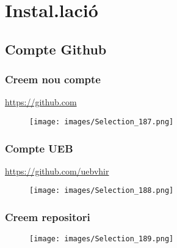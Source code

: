 \documentclass{beamer}
\begin{document}
\section{Instal.laci\'o}
\subsection{Compte Github} 
\begin{frame}
\frametitle{Creem nou compte}
\url{https://github.com} \hspace{1cm} 
	\begin{figure}
		\texttt{[image: images/Selection\_187.png]}
	\end{figure}
\end{frame}


\begin{frame}
	\frametitle{Compte UEB}
	\url{https://github.com/uebvhir}
	\begin{figure}
		\texttt{[image: images/Selection\_188.png]}
	\end{figure}
\end{frame}



\begin{frame}
	\frametitle{Creem repositori}
	\begin{figure}
		\texttt{[image: images/Selection\_189.png]}
	\end{figure}
\end{frame}




\end{document}
